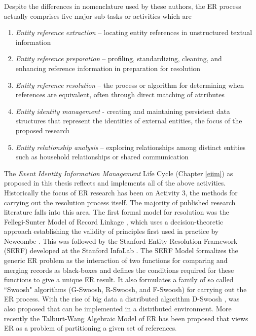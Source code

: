 Despite the differences in nomenclature used by these authors, the ER process actually comprises five major sub-tasks or activities \cite{talburt2011entity} which are
\begin{enumerate} 
\item	\textit{Entity reference extraction} – locating entity references in unstructured textual information
\item	\textit{Entity reference preparation} – profiling, standardizing, cleaning, and enhancing reference information in preparation for resolution
\item	\textit{Entity reference resolution} – the process or algorithm for determining when references are equivalent, often through direct matching of attributes
\item	\textit{Entity identity management} - creating and maintaining persistent data structures that represent the identities of external entities, the focus of the proposed research
\item	\textit{Entity relationship analysis} – exploring relationships among distinct entities such as household relationships or shared communication
\end{enumerate}

The \textit{Event Identity Information Management} Life Cycle (Chapter \ref{eiim}) as proposed in this thesis reflects and implements all of the above activities. Historically the focus of ER research has been on Activity 3, the methods for carrying out the resolution process itself. The majority of published research literature falls into this area. The first formal model for resolution was the Fellegi-Sunter Model of Record Linkage \cite{fellegi1969theory}, which uses a decision-theoretic approach establishing the validity of principles first used in practice by Newcombe \cite{newcombe1959automatic}.  This was followed by the Stanford Entity Resolution Framework (SERF) developed at the Stanford InfoLab \cite{benjelloun2006generic}.  The SERF Model formalizes the generic ER problem as the interaction of two functions for comparing and merging records as black-boxes and defines the conditions required for these functions to give a unique ER result. It also formulates a family of so called ``Swoosh" algorithms (G-Swoosh, R-Swoosh, and F-Swoosh) for carrying out the ER process. With the rise of big data a distributed algorithm D-Swoosh \cite{benjelloun2007d}, was also proposed that can be implemented in a distributed environment. More recently the Talburt-Wang Algebraic Model of ER has been proposed \cite{talburt2007algebraic} that views ER as a problem of partitioning a given set of references. 
 
